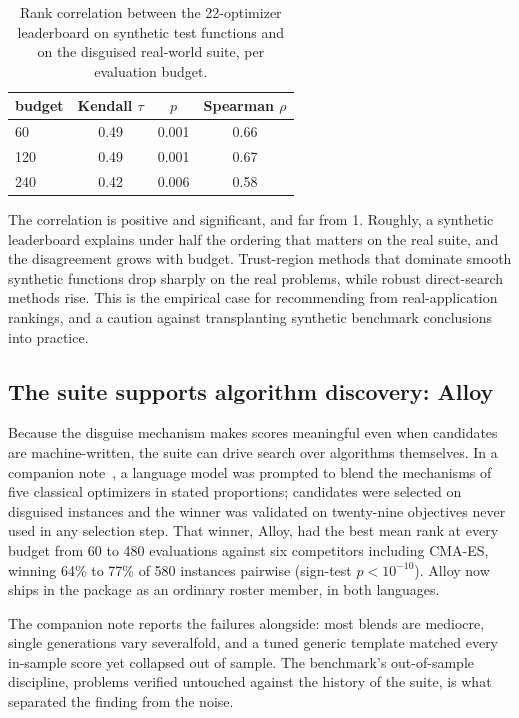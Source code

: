 \documentclass[article]{jss}
\begin{document}
\begin{table}[t]
\centering
\begin{tabular}{lccc}
\toprule
budget & Kendall $\tau$ & $p$ & Spearman $\rho$ \\
\midrule
60  & 0.49 & 0.001 & 0.66 \\
120 & 0.49 & 0.001 & 0.67 \\
240 & 0.42 & 0.006 & 0.58 \\
\bottomrule
\end{tabular}
\caption{Rank correlation between the 22-optimizer leaderboard on synthetic
test functions and on the disguised real-world suite, per evaluation
budget.}
\label{tab:tau}
\end{table}

The correlation is positive and significant, and far from 1. Roughly, a
synthetic leaderboard explains under half the ordering that matters on the
real suite, and the disagreement grows with budget. Trust-region methods
that dominate smooth synthetic functions drop sharply on the real problems,
while robust direct-search methods rise. This is the empirical case for
recommending from real-application rankings, and a caution against
transplanting synthetic benchmark conclusions into practice.

\subsection{The suite supports algorithm discovery: Alloy}

Because the disguise mechanism makes scores meaningful even when candidates
are machine-written, the suite can drive search over algorithms themselves.
In a companion note~\citep{alloy2026}, a language model was prompted to
blend the mechanisms of five classical optimizers in stated proportions;
candidates were selected on disguised instances and the winner was validated
on twenty-nine objectives never used in any selection step. That winner,
Alloy, had the best mean rank at every budget from 60 to 480 evaluations
against six competitors including CMA-ES, winning 64\% to 77\% of 580
instances pairwise (sign-test $p < 10^{-10}$). Alloy now ships in the
package as an ordinary roster member, in both languages.

The companion note reports the failures alongside: most blends are
mediocre, single generations vary severalfold, and a tuned generic template
matched every in-sample score yet collapsed out of sample. The benchmark's
out-of-sample discipline, problems verified untouched against the history
of the suite, is what separated the finding from the noise.
\end{document}
